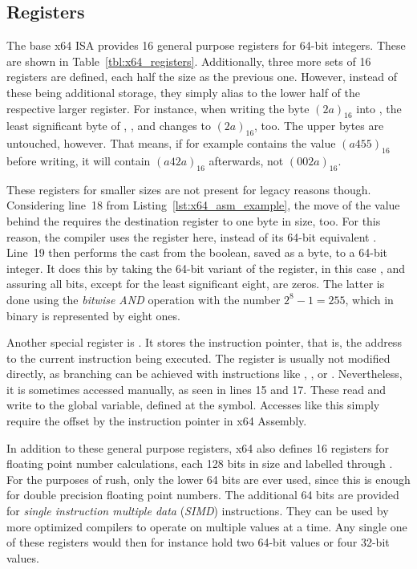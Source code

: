 \subsection{Registers}

The base x64 ISA provides 16 general purpose registers for 64-bit integers.
These are shown in Table~\ref{tbl:x64_registers}.
Additionally, three more sets of 16 registers are defined, each half the size as the previous one.
However, instead of these being additional storage, they simply alias to the lower half of the respective larger register.
For instance, when writing the byte $(2a)_{16}$ into , the least significant byte of , , and  changes to $(2a)_{16}$, too.
The upper bytes are untouched, however.
That means, if for example  contains the value $(a455)_{16}$ before writing, it will contain $(a42a)_{16}$ afterwards, not $(002a)_{16}$.

These registers for smaller sizes are not present for legacy reasons though.
Considering line~18 from Listing~\ref{lst:x64_asm_example}, the move of the value behind the  requires the destination register to one byte in size, too.
For this reason, the compiler uses the  register here, instead of its 64-bit equivalent .
Line~19 then performs the cast from the boolean, saved as a byte, to a 64-bit integer.
It does this by taking the 64-bit variant of the register, in this case , and assuring all bits, except for the least significant eight, are zeros.
The latter is done using the \emph{bitwise AND} operation with the number $2^8-1=255$, which in binary is represented by eight ones.

Another special register is .
It stores the instruction pointer, that is, the address to the current instruction being executed.
The register is usually not modified directly, as branching can be achieved with instructions like , , or .
Nevertheless, it is sometimes accessed manually, as seen in lines 15 and 17.
These read and write to the global  variable, defined at the  symbol.
Accesses like this simply require the offset by the instruction pointer in x64 Assembly.

In addition to these general purpose registers, x64 also defines 16 registers for floating point number calculations, each 128 bits in size and labelled  through .
For the purposes of rush, only the lower 64 bits are ever used, since this is enough for double precision floating point numbers.
The additional 64 bits are provided for \emph{single instruction multiple data} (\emph{SIMD}) instructions.
They can be used by more optimized compilers to operate on multiple values at a time.
Any single one of these registers would then for instance hold two 64-bit values or four 32-bit values.


